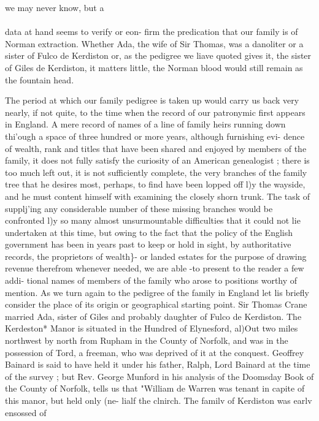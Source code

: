 \documentclass[oneside]{book}
\begin{document}
we may never know, but a\\\\ data at hand seems to verify or eon- 
firm the predication that our family is of Norman extraction. 
Whether Ada, the wife of Sir Thomas, was a danoliter or a sister 
of Fulco de Kerdiston or, as the pedigree we liave quoted gives 
it, the sister of Giles de Kerdiston, it matters little, the Norman 
blood would still remain as the fountain head. 

The period at which our family pedigree is taken up would 
carry us back very nearly, if not quite, to the time when the 
record of our patronymic first appears in England. A mere 
record of names of a line of family heirs running down thi'ough a 
space of three hundred or more years, although furnishing evi- 
dence of wealth, rank and titles that have been shared and 
enjoyed by members of the family, it does not fully satisfy the 
curiosity of an American genealogist ; there is too much left out, 
it is not sufficiently complete, the very branches of the family 
tree that he desires most, perhaps, to find have been lopped off l)y 
the wayside, and he must content himself with examining the 
closely shorn trunk. The task of supplj'ing any considerable 
number of these missing branches would be confronted l)y so 
many almost unsurmountable difficulties that it could not lie 
undertaken at this time, but owing to the fact that the policy of 
the English government has been in years past to keep or hold in 
sight, by authoritative records, the proprietors of wealth\}- or 
landed estates for the purpose of drawing revenue therefrom 
whenever needed, we are able -to present to the reader a few addi- 
tional names of members of the family who arose to positions 
worthy of mention. As we turn again to the pedigree of the 
family in England let lis briefly consider the place of its origin 
or geographical starting point. Sir Thomas Crane married Ada, 
sister of Giles and probably daughter of Fulco de Kerdiston. 
The Kerdeston* Manor is situated in the Hundred of Elynesford, 
al)Out two miles northwest by north from Rupham in the County 
of Norfolk, and was in the possession of Tord, a freeman, who 
was deprived of it at the conquest. Geoffrey Bainard is said to 
have held it under his father, Ralph, Lord Bainard at the time of 
the survey ; but Rev. George Munford in his analysis of the 
Doomsday Book of the County of Norfolk, tells us that "William 
de Warren was tenant in capite of this manor, but held only (ne- 
lialf the clnirch. The familv of Kerdiston was earlv ensossed of 
\end{document}
